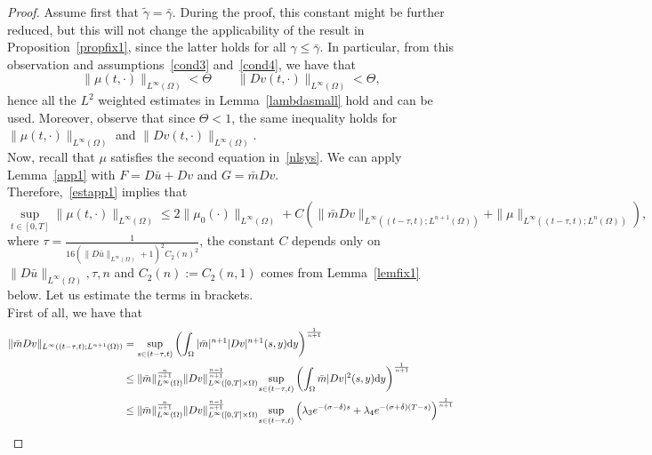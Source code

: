 \documentclass[10pt,a4paper,nouppercase,nowrite]{article}
\numberwithin{equation}{section}
\newcommand{\di}{{\rm d}}
\theoremstyle{definition}
\begin{document}
		\begin{proof}
			Assume first that $\tilde{\gamma}=\bar{\gamma}$. During the proof, this constant might be further reduced, but this will not change the applicability of the result in Proposition~\ref{propfix1}, since the latter holds for all $\gamma \le \bar{\gamma}$. In particular, from this observation and assumptions~\eqref{cond3} and~\eqref{cond4}, we have that
			$$\|\mu(t,\cdot)\|_{L^{\infty}(\Omega)} < \Theta \qquad \|Dv(t,\cdot)\|_{L^{\infty}(\Omega)} < \Theta,$$
			hence all the $L^2$ weighted estimates in Lemma~\ref{lambdasmall} hold and can be used. Moreover, observe that since $\Theta < 1$, the same inequality holds for $\|\mu(t,\cdot)\|_{L^{\infty}(\Omega)}$ and $\|Dv(t,\cdot)\|_{L^{\infty}(\Omega)}$. \\
			Now, recall that $\mu$ satisfies the second equation in~\eqref{nlsys}. We can apply Lemma~\ref{app1} with $F=D\bar{u}+Dv$ and $G=\bar{m}Dv$. \\
			Therefore,~\eqref{estapp1} implies that
			\begin{equation}
				\underset{t \in [0,T]}{\sup} \|\mu(t,\cdot)\|_{L^{\infty}(\Omega)} \le 2 \| \mu_0(\cdot) \|_{L^{\infty}(\Omega)} + C \left( \| \bar m Dv \|_{L^{\infty}((t-\tau,t); L^{n+1}(\Omega))} + \| \mu \|_{L^{\infty}((t-\tau,t);L^n(\Omega))} \right),
				\label{estmufin1}
			\end{equation}
			where $\tau=\frac{1}{16 (\|D\bar{u}\|_{L^{\infty}(\Omega)}+1)^2 C_2(n)^2}$, the constant $C$ depends only on $\| D \bar u \|_{L^{\infty}(\Omega)}, \tau, n$ and $C_2(n):=C_2(n,1)$ comes from Lemma~\ref{lemfix1} below. Let us estimate the terms in brackets. \\
			First of all, we have that
			\begin{equation} \label{Dvinterpol}
				\begin{split}
				\| \bar m Dv \|_{L^{\infty}((t-\tau,t);L^{n+1}(\Omega))} &= \underset{s \in (t-\tau,t)}{\sup} \left( \int_{\Omega} |\bar m|^{n+1} |Dv|^{n+1}(s,y) \di y \right)^{\frac{1}{n+1}} \\ 
				&\le \| \bar m \|_{L^{\infty}(\Omega)}^{\frac{n}{n+1}} \| Dv \|_{L^{\infty}([0,T] \times \Omega)}^{\frac{n-1}{n+1}} \underset{s \in (t-\tau,t)}{\sup} \left( \int_{\Omega} \bar m |Dv|^2(s,y) \di y \right)^{\frac{1}{n+1}} \\
				&\le \| \bar m \|_{L^{\infty}(\Omega)}^{\frac{n}{n+1}} \| Dv \|_{L^{\infty}([0,T] \times \Omega)}^{\frac{n-1}{n+1}} \underset{s \in (t-\tau,t)}{\sup} \left( \lambda_3 e^{-(\sigma-\delta)s} + \lambda_4 e^{-(\sigma+\delta)(T-s)} \right)^{\frac{1}{n+1}} \\

\end{split}
\end{equation}
\end{proof}
\end{document}
